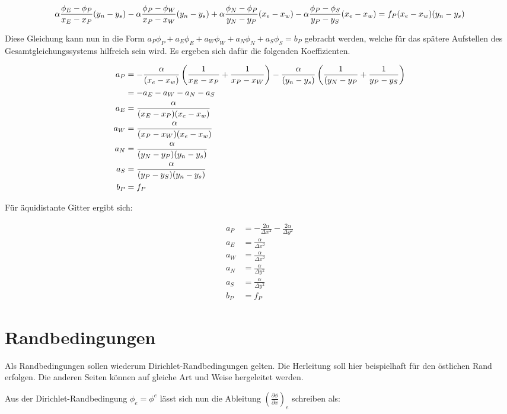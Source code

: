 \documentclass[10pt, ngerman,colorback,accentcolor=tud2d]{tudreport}
\begin{document}
\begin{equation*}
  \alpha \frac{\phi_E-\phi_P}{x_E-x_P} (y_n-y_s) -
  \alpha \frac{\phi_P-\phi_W}{x_P-x_W} (y_n-y_s) +
  \alpha \frac{\phi_N-\phi_P}{y_N-y_P} (x_e-x_w) -
  \alpha \frac{\phi_P-\phi_S}{y_P-y_S} (x_e-x_w) =
  f_P (x_e-x_w) (y_n-y_s)
\end{equation*}

Diese Gleichung kann nun in die Form
$a_P\phi_P +a_E\phi_E +a_W\phi_W +a_N\phi_N +a_S\phi_S =b_P$
gebracht werden, welche für das spätere Aufstellen des Gesamtgleichungssystems
hilfreich sein wird. Es ergeben sich dafür die folgenden Koeffizienten.

\begin{align*}
  a_P &= -\frac{\alpha}{(x_e-x_w)} \left({\frac{1}{x_E-x_P} + \frac{1}{x_P-x_W}}\right)
  -\frac{\alpha}{(y_n-y_s)} \left({\frac{1}{(y_N-y_P} + \frac{1}{y_P-y_S}}\right)\\
  &= -a_E-a_W-a_N-a_S\\
  a_E &= \frac{\alpha}{(x_E-x_P)(x_e-x_w)} \\
  a_W &= \frac{\alpha}{(x_P-x_W)(x_e-x_w)} \\
  a_N &= \frac{\alpha}{(y_N-y_P)(y_n-y_s)} \\
  a_S &= \frac{\alpha}{(y_P-y_S)(y_n-y_s)} \\
  b_P &=f_P
\end{align*}

Für äquidistante Gitter ergibt sich:

\begin{align*}
  a_P &= -\frac{2 \alpha}{\Delta x^2} -\frac{2 \alpha}{\Delta y^2}\\
  a_E &= \frac{\alpha}{\Delta x^2} \\
  a_W &= \frac{\alpha}{\Delta x^2} \\
  a_N &= \frac{\alpha}{\Delta y^2} \\
  a_S &= \frac{\alpha}{\Delta y^2} \\
  b_P &=f_P
\end{align*}

\section{Randbedingungen}
\label{sec:Randbedingungen}

Als Randbedingungen sollen wiederum Dirichlet-Randbedingungen gelten. Die Herleitung
soll hier beispielhaft für den östlichen Rand erfolgen.
Die anderen Seiten können auf gleiche Art und Weise hergeleitet werden.

Aus der Dirichlet-Randbedingung $\phi_e = \phi^e$ lässt sich nun die Ableitung
$\left({\frac{\partial \phi}{\partial x}}\right)_e$ schreiben als:
\end{document}
